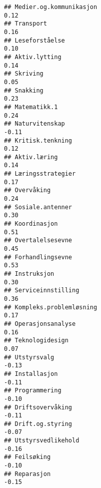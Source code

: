 \documentclass[
]{article}
\begin{document}
\begin{verbatim}
## Medier.og.kommunikasjon                                                           0.12
## Transport                                                                         0.16
## Leseforståelse                                                                    0.10
## Aktiv.lytting                                                                     0.14
## Skriving                                                                          0.05
## Snakking                                                                          0.23
## Matematikk.1                                                                      0.24
## Naturvitenskap                                                                   -0.11
## Kritisk.tenkning                                                                  0.12
## Aktiv.læring                                                                      0.14
## Læringsstrategier                                                                 0.17
## Overvåking                                                                        0.24
## Sosiale.antenner                                                                  0.30
## Koordinasjon                                                                      0.51
## Overtalelsesevne                                                                  0.45
## Forhandlingsevne                                                                  0.53
## Instruksjon                                                                       0.30
## Serviceinnstilling                                                                0.36
## Kompleks.problemløsning                                                           0.17
## Operasjonsanalyse                                                                 0.16
## Teknologidesign                                                                   0.07
## Utstyrsvalg                                                                      -0.13
## Installasjon                                                                     -0.11
## Programmering                                                                    -0.10
## Driftsovervåking                                                                 -0.11
## Drift.og.styring                                                                 -0.07
## Utstyrsvedlikehold                                                               -0.16
## Feilsøking                                                                       -0.10
## Reparasjon                                                                       -0.15

\end{verbatim}
\end{document}
